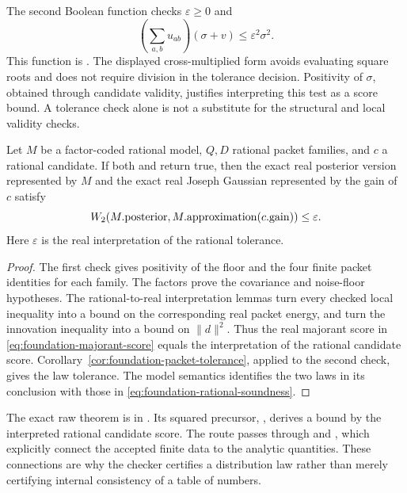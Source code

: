 The second Boolean function checks $\varepsilon\ge0$ and
\[
 \left(\sum_{a,b}u_{ab}\right)(\sigma+v)
    \le\varepsilon^2\sigma^2.
\]
This function is . The displayed cross-multiplied form avoids evaluating square roots and does not require division in the tolerance decision. Positivity of $\sigma$, obtained through candidate validity, justifies interpreting this test as a score bound. A tolerance check alone is not a substitute for the structural and local validity checks.

\begin{theorem}
\label{thm:foundation-checked-tolerance}
Let $M$ be a factor-coded rational model, $Q,D$ rational packet families, and $c$ a rational candidate. If both  and  return true, then the exact real posterior version represented by $M$ and the exact real Joseph Gaussian represented by the gain of $c$ satisfy
\begin{equation}
 W_2(M.\mathrm{posterior},M.\mathrm{approximation}(c.\mathrm{gain}))
 \le\varepsilon.
 \label{eq:foundation-rational-soundness}
\end{equation}
Here $\varepsilon$ is the real interpretation of the rational tolerance.
\end{theorem}
\begin{proof}
The first check gives positivity of the floor and the four finite packet identities for each family. The factors prove the covariance and noise-floor hypotheses. The rational-to-real interpretation lemmas turn every checked local inequality into a bound on the corresponding real packet energy, and turn the innovation inequality into a bound on $\|d\|^2$. Thus the real majorant score in \eqref{eq:foundation-majorant-score} equals the interpretation of the rational candidate score. Corollary~\ref{cor:foundation-packet-tolerance}, applied to the second check, gives the law tolerance. The model semantics identifies the two laws in its conclusion with those in \eqref{eq:foundation-rational-soundness}.
\end{proof}

The exact raw theorem is  in . Its squared precursor, , derives a bound by the interpreted rational candidate score. The route passes through  and , which explicitly connect the accepted finite data to the analytic quantities. These connections are why the checker certifies a distribution law rather than merely certifying internal consistency of a table of numbers.


